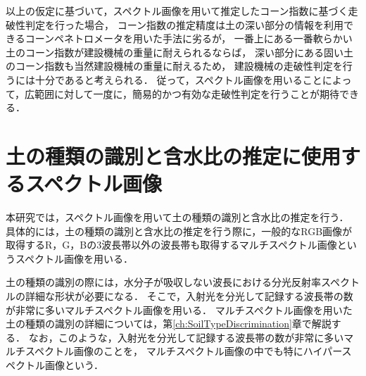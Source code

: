 以上の仮定に基づいて，スペクトル画像を用いて推定したコーン指数に基づく走破性判定を行った場合，
コーン指数の推定精度は土の深い部分の情報を利用できるコーンペネトロメータを用いた手法に劣るが，
一番上にある一番軟らかい土のコーン指数が建設機械の重量に耐えられるならば，
深い部分にある固い土のコーン指数も当然建設機械の重量に耐えるため，
建設機械の走破性判定を行うには十分であると考えられる．
従って，スペクトル画像を用いることによって，広範囲に対して一度に，簡易的かつ有効な走破性判定を行うことが期待できる．




\clearpage

\section{土の種類の識別と含水比の推定に使用するスペクトル画像}
\label{sec:HyperAndMultiImages}

本研究では，スペクトル画像を用いて土の種類の識別と含水比の推定を行う．
具体的には，土の種類の識別と含水比の推定を行う際に，一般的なRGB画像が取得するR，G，Bの3波長帯以外の波長帯も取得するマルチスペクトル画像というスペクトル画像を用いる\cite{中野1996}．

土の種類の識別の際には，水分子が吸収しない波長における分光反射率スペクトルの詳細な形状が必要になる．
そこで，入射光を分光して記録する波長帯の数が非常に多いマルチスペクトル画像を用いる．
マルチスペクトル画像を用いた土の種類の識別の詳細については，第\ref{ch:SoilTypeDiscrimination}章で解説する．
なお，このような，入射光を分光して記録する波長帯の数が非常に多いマルチスペクトル画像のことを，
マルチスペクトル画像の中でも特にハイパースペクトル画像という\cite{横矢2014}．

